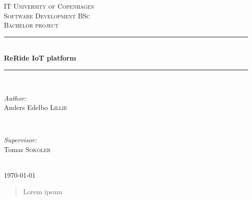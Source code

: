 \documentclass[]{article}
\begin{document}
\begin{titlepage}
	
	\newcommand{\HRule}{\rule{\linewidth}{0.5mm}} %
	
	\center %
	
	\textsc{\LARGE IT University of Copenhagen}\\[1.5cm] %
	\textsc{\Large Software Development BSc}\\[0.5cm] %
	\textsc{\large Bachelor project}\\[0.5cm] %
	
	\HRule \\[0.4cm]
	{ \huge \bfseries ReRide IoT platform}\\[0.4cm] %
	\HRule \\[1.5cm]

	\begin{minipage}{0.4\textwidth}
		\begin{flushleft} \large
			\emph{Author:}\\
			Anders Edelbo \textsc{Lillie} %
		\end{flushleft}
	\end{minipage}
	~
	\begin{minipage}{0.4\textwidth}
		\begin{flushright} \large
			\emph{Supervisor:} \\
			Tomas \textsc{Sokoler} %
		\end{flushright}
	\end{minipage}\\[4cm]
	
	{\large \today}\\[3cm] 
	
	\vfill %
	
\end{titlepage}

\begin{abstract}
	Lorem ipsum
\end{abstract}
\clearpage

\tableofcontents
\clearpage
{} %











\end{document}
